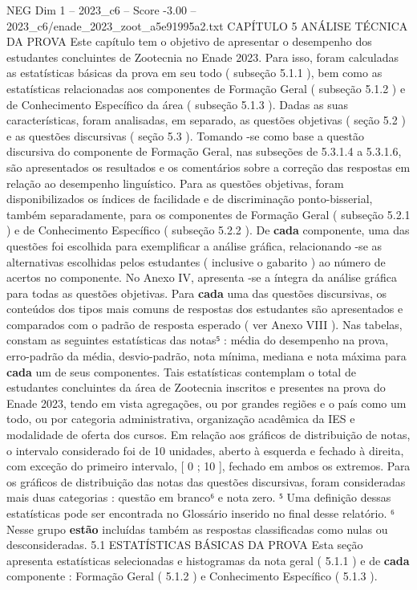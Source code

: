 \begin{textsample}{NEG Dim 1 – 2023\_c6 – Score -3.00 – 2023\_c6/enade\_2023\_zoot\_a5e91995a2.txt}  \label{ex:f1_neg_206}
CAPÍTULO 5 ANÁLISE TÉCNICA DA PROVA Este capítulo tem o objetivo de apresentar o desempenho dos estudantes concluintes de Zootecnia no Enade 2023.
Para isso, foram calculadas as estatísticas básicas da prova em seu todo ( subseção 5.1.1 ), bem como as estatísticas relacionadas aos componentes de Formação Geral ( subseção 5.1.2 ) e de Conhecimento Específico da área ( subseção 5.1.3 ).
Dadas as suas características, foram analisadas, em separado, as questões objetivas ( seção 5.2 ) e as questões discursivas ( seção 5.3 ).
Tomando -se como base a questão discursiva do componente de Formação Geral, nas subseções de 5.3.1.4 a 5.3.1.6, são apresentados os resultados e os comentários sobre a correção das respostas em relação ao desempenho linguístico.
Para as questões objetivas, foram disponibilizados os índices de facilidade e de discriminação ponto-bisserial, também separadamente, para os componentes de Formação Geral ( subseção 5.2.1 ) e de Conhecimento Específico ( subseção 5.2.2 ).
De \textbf{cada} componente, uma das questões foi escolhida para exemplificar a análise gráfica, relacionando -se as alternativas escolhidas pelos estudantes ( inclusive o gabarito ) ao número de acertos no componente.
No Anexo IV, apresenta -se a íntegra da análise gráfica para todas as questões objetivas.
Para \textbf{cada} uma das questões discursivas, os conteúdos dos tipos mais comuns de respostas dos estudantes são apresentados e comparados com o padrão de resposta esperado ( ver Anexo VIII ).
Nas tabelas, constam as seguintes estatísticas das notas⁵ : média do desempenho na prova, erro-padrão da média, desvio-padrão, nota mínima, mediana e nota máxima para \textbf{cada} um de seus componentes.
Tais estatísticas contemplam o total de estudantes concluintes da área de Zootecnia inscritos e presentes na prova do Enade 2023, tendo em vista agregações, ou por grandes regiões e o país como um todo, ou por categoria administrativa, organização acadêmica da IES e modalidade de oferta dos cursos.
Em relação aos gráficos de distribuição de notas, o intervalo considerado foi de 10 unidades, aberto à esquerda e fechado à direita, com exceção do primeiro intervalo, [ 0 ; 10 ], fechado em ambos os extremos.
Para os gráficos de distribuição das notas das questões discursivas, foram consideradas mais duas categorias : questão em branco⁶ e nota zero. ⁵ Uma definição dessas estatísticas pode ser encontrada no Glossário inserido no final desse relatório. ⁶ Nesse grupo \textbf{estão} incluídas também as respostas classificadas como nulas ou desconsideradas. 5.1 ESTATÍSTICAS BÁSICAS DA PROVA Esta seção apresenta estatísticas selecionadas e histogramas da nota geral ( 5.1.1 ) e de \textbf{cada} componente : Formação Geral ( 5.1.2 ) e Conhecimento Específico ( 5.1.3 ).

\end{textsample}
